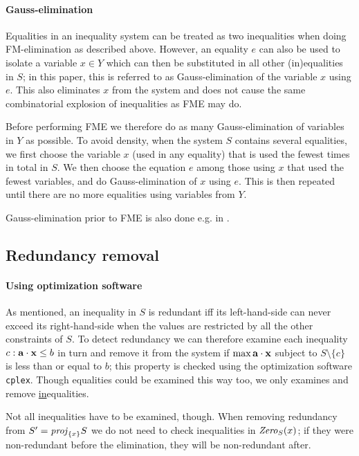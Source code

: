 \paragraph{Gauss-elimination}
Equalities in an inequality system can be treated as two inequalities when doing FM-elimination as described above. However, an equality $e$ can also be used to isolate a variable $x\in Y$ which can then be substituted in all other (in)equalities in $S$; in this paper, this is referred to as Gauss-elimination of the variable $x$ using $e$. This also eliminates $x$ from the system and does not cause the same combinatorial explosion of inequalities as FME may do. 

Before performing FME we therefore do as many Gauss-elimination of variables in $Y$ as possible.
%
To avoid density, when the system $S$ contains several equalities, we first choose the variable $x$ (used in any equality) that is used the fewest times in total in $S$. We then choose the equation $e$ among those using $x$ that used the fewest variables, and do Gauss-elimination of $x$ using $e$. 
This is then repeated until there are no more equalities using variables from $Y$.

Gauss-elimination prior to FME is also done e.g. in \cite{simon05}.
 
\subsection*{Redundancy removal}
\paragraph{Using optimization software}
As mentioned, an inequality in $S$ is redundant iff its left-hand-side can never exceed its right-hand-side when the values are restricted by all the other constraints of $S$. 
To detect redundancy we can therefore examine each inequality $c: \mathbf{a}\cdot \mathbf{x}\leq b$ in turn and remove it from the system if $\max \mathbf{a}\cdot \mathbf{x}$ subject to $S\setminus\{c\}$ is less than or equal to $b$; this property is checked using the optimization software \texttt{cplex}. Though equalities could be examined this way too, we only examines and remove \underline{in}equalities. %

Not all inequalities have to be examined, though. When removing redundancy from $S' = \mathit{proj}_{\{x\}}S$ we do not need to check inequalities in $\mathit{Zero}_S(x)$; if they were non-redundant before the elimination, they will be non-redundant after.

